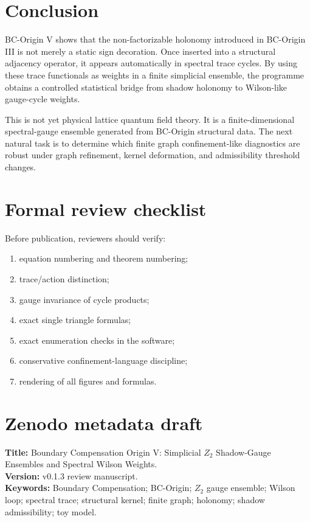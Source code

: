 \documentclass[11pt]{article}
\begin{document}
\section{Conclusion}

BC-Origin V shows that the non-factorizable holonomy introduced in BC-Origin III is not merely a static sign decoration. Once inserted into a structural adjacency operator, it appears automatically in spectral trace cycles. By using these trace functionals as weights in a finite simplicial ensemble, the programme obtains a controlled statistical bridge from shadow holonomy to Wilson-like gauge-cycle weights.

This is not yet physical lattice quantum field theory. It is a finite-dimensional spectral-gauge ensemble generated from BC-Origin structural data. The next natural task is to determine which finite graph confinement-like diagnostics are robust under graph refinement, kernel deformation, and admissibility threshold changes.

\appendix
\section{Formal review checklist}

Before publication, reviewers should verify:
\begin{enumerate}[leftmargin=2em]
\item equation numbering and theorem numbering;
\item trace/action distinction;
\item gauge invariance of cycle products;
\item exact single triangle formulas;
\item exact enumeration checks in the software;
\item conservative confinement-language discipline;
\item rendering of all figures and formulas.
\end{enumerate}

\section{Zenodo metadata draft}

\textbf{Title:} Boundary Compensation Origin V: Simplicial $Z_2$ Shadow-Gauge Ensembles and Spectral Wilson Weights.\\
\textbf{Version:} v0.1.3 review manuscript.\\
\textbf{Keywords:} Boundary Compensation; BC-Origin; $Z_2$ gauge ensemble; Wilson loop; spectral trace; structural kernel; finite graph; holonomy; shadow admissibility; toy model.
\end{document}

